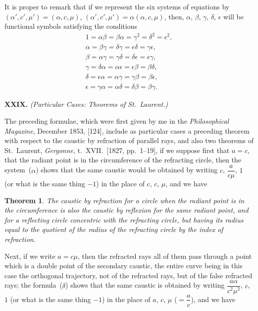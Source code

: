\documentclass[11pt,a4paper]{book}
\newtheorem*{theorem}{Theorem}
\begin{document}
\begin{center}
It is proper to remark that if we represent the six systems
of equations by
$(\alpha', c', \mu') = (\alpha, c, \mu)$,
$(\alpha', c', \mu') = \alpha(\alpha, c, \mu)$, \etc{}
then, $\alpha$, $\beta$, $\gamma$, $\delta$, $\epsilon$ will be functional symbols
satisfying the conditions
\begin{gather*}
1 = \alpha\beta = \beta\alpha = \gamma^{2} = \delta^{2} = \epsilon^{2}, \\
\alpha = \beta\gamma = \delta\gamma = \epsilon\delta = \gamma\epsilon, \\
\beta = \alpha\gamma = \gamma\delta = \delta\epsilon = \epsilon\gamma, \\
\gamma = \delta\alpha = \alpha\epsilon = \epsilon\beta = \beta\delta, \\
\delta = \epsilon\alpha = \alpha\gamma = \gamma\beta = \beta\epsilon, \\
\epsilon = \gamma\alpha = \alpha\delta = \delta\beta = \beta\gamma.
\end{gather*}

\medskip\noindent\textbf{XXIX.}
\textit{(Particular Cases: Theorems of St.~Laurent.)}

The preceding formulae, which were first given by me in the
\textit{Philosophical Magazine}, December 1853, [124], include as particular
cases a preceding theorem with respect to the caustic by refraction
of parallel rays, and also two theorems of St.~Laurent,
\textit{Gergonne}, t.~XVII.\ [1827, pp.~1--19], \viz{} if we suppose first
that $a = c$, \ie{} that the radiant point is in the circumference
of the refracting circle, then the system~($\alpha$) shows that the
same caustic would be obtained by writing $c$, $\dfrac{a}{c\mu}$, $1$
(or what is the same thing $-1$) in the place of $c$, $c$, $\mu$,
and we have

\begin{theorem}
The caustic by refraction for a circle when the radiant point
is in the circumference is also the caustic by reflexion for the
same radiant point, and for a reflecting circle concentric with
the refracting circle, but having its radius equal to the quotient
of the radius of the refracting circle by the index of refraction.
\end{theorem}

Next, if we write $a = c\mu$, then the refracted rays all of them
pass through a point which is a double point of the secondary
caustic, the entire curve being in this case the orthogonal
trajectory, not of the refracted rays, but of the false refracted rays;
the formula~($\delta$) shows that the same caustic is obtained by
writing $\dfrac{a\alpha}{c^{2}\mu^{2}}$, $c$, $1$ (or what is the same thing $-1$)
in the place of $a$, $c$, $\mu$ ($= \dfrac{a}{c}$), and we have


\end{center}
\end{document}
